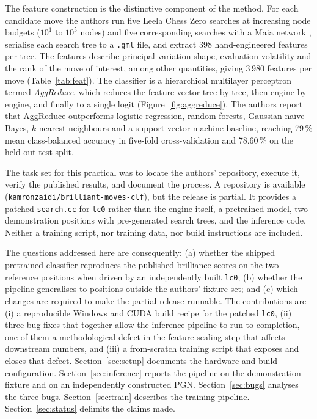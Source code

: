 \documentclass[11pt,a4paper]{article}
\begin{document}
The feature construction is the distinctive component of the method.
For each candidate move the authors run five Leela Chess Zero searches
at increasing node budgets ($10^1$ to $10^5$ nodes) and five
corresponding searches with a Maia network
\citep{mcilroy2020aligning}, serialise each search tree to a
\texttt{.gml} file, and extract 398 hand-engineered features per
tree. The features describe principal-variation shape, evaluation
volatility and the rank of the move of interest, among other
quantities, giving 3\,980 features per move (Table~\ref{tab:feat}).
The classifier is a hierarchical multilayer perceptron termed
\emph{AggReduce}, which reduces the feature vector tree-by-tree, then
engine-by-engine, and finally to a single logit
(Figure~\ref{fig:aggreduce}). The authors report that AggReduce
outperforms logistic regression, random forests, Gaussian na\"ive
Bayes, $k$-nearest neighbours and a support vector machine baseline,
reaching 79\,\% mean class-balanced accuracy in five-fold
cross-validation and 78.60\,\% on the held-out test split.

The task set for this practical was to locate the authors'
repository, execute it, verify the published results, and document
the process. A repository is available
(\texttt{kamronzaidi/brilliant-moves-clf}), but the release is
partial. It provides a patched \texttt{search.cc} for \texttt{lc0}
rather than the engine itself, a pretrained model, two demonstration
positions with pre-generated search trees, and the inference code.
Neither a training script, nor training data, nor build instructions
are included.

The questions addressed here are consequently: (a) whether the
shipped pretrained classifier reproduces the published brilliance
scores on the two reference positions when driven by an
independently built \texttt{lc0}; (b) whether the pipeline
generalises to positions outside the authors' fixture set; and (c)
which changes are required to make the partial release runnable. The
contributions are (i) a reproducible Windows and CUDA build recipe
for the patched \texttt{lc0}, (ii) three bug fixes that together
allow the inference pipeline to run to completion, one of them a
methodological defect in the feature-scaling step that affects
downstream numbers, and (iii) a from-scratch training script that
exposes and closes that defect. Section~\ref{sec:setup} documents
the hardware and build configuration. Section~\ref{sec:inference}
reports the pipeline on the demonstration fixture and on an
independently constructed PGN. Section~\ref{sec:bugs} analyses the
three bugs. Section~\ref{sec:train} describes the training pipeline.
Section~\ref{sec:status} delimits the claims made.
\end{document}
